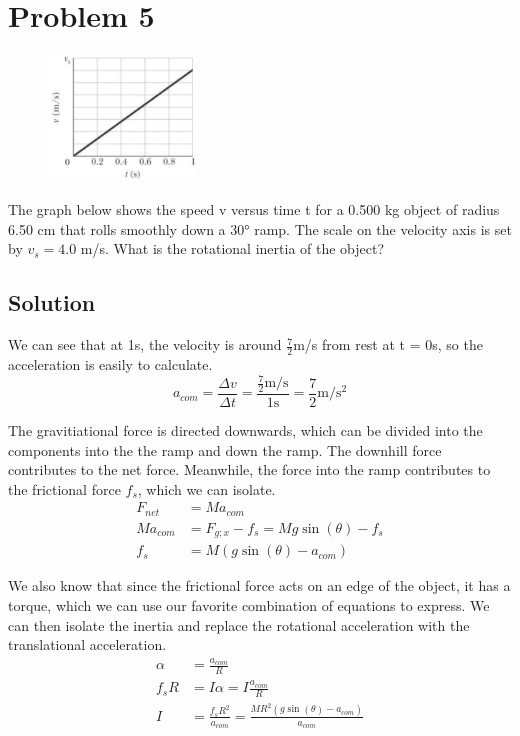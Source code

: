 \documentclass[12pt]{article}
\begin{document}
\section{Problem 5}
\begin{figure}
    \vspace{-50pt}
    \includegraphics[width=0.35\textwidth]{graph_5.png} 
\end{figure}
The graph below shows the speed v versus time t for a 0.500 kg object of radius 6.50 cm that rolls smoothly down a 30\unit{\degree} ramp. The scale on the velocity axis is set by $v_s = 4.0$ m/s. What is the rotational inertia of the object?

\subsection{Solution}
We can see that at 1s, the velocity is around $\frac{7}{2}$m/s from rest at t = 0s, so the acceleration is easily to calculate.
\begin{equation}
    a_{com} =   \frac{\Delta v}{\Delta t} 
        = \frac{\frac{7}{2}\unit{\meter/\second}}{1\unit{\second}} 
        = \frac{7}{2}\unit{\meter/\second^2}
\end{equation}

The gravitiational force is directed downwards, which can be divided into the components into the the ramp and down the ramp. The downhill force contributes to the net force. Meanwhile, the force into the ramp contributes to the frictional force $f_s$, which we can isolate.
\begin{align}
    F_{net} &=  Ma_{com}\\
    Ma_{com}    &=  F_{g;x} - f_s
        =   Mg\sin(\theta) - f_s\\
    f_s &=  M(g\sin(\theta) - a_{com})
\end{align}

We also know that since the frictional force acts on an edge of the object, it has a torque, which we can use our favorite combination of equations to express. We can then isolate the inertia and replace the rotational acceleration with the translational acceleration.
\begin{align}
    \alpha  &=  \frac{a_{com}}{R}\\
    f_s R   &=  I\alpha
        =   I\frac{a_{com}}{R}\\
    I   &=  \frac{f_s R^2}{a_{com}}
        =   \frac{MR^2(g\sin(\theta) - a_{com})}{a_{com}}
\end{align}
\end{document}
